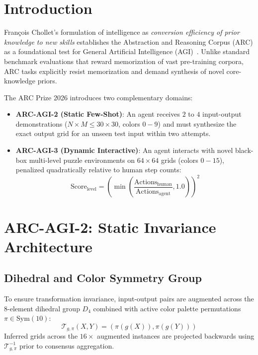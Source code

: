 \documentclass[10pt,journal,compsoc]{IEEEtran}
\begin{document}
\section{Introduction}
François Chollet's formulation of intelligence as \emph{conversion efficiency of prior knowledge to new skills} establishes the Abstraction and Reasoning Corpus (ARC) as a foundational test for General Artificial Intelligence (AGI)~\cite{chollet2019measure}. Unlike standard benchmark evaluations that reward memorization of vast pre-training corpora, ARC tasks explicitly resist memorization and demand synthesis of novel core-knowledge priors.

The ARC Prize 2026 introduces two complementary domains:
\begin{itemize}
    \item \textbf{ARC-AGI-2 (Static Few-Shot)}: An agent receives $2$ to $4$ input-output demonstrations ($N \times M \le 30 \times 30$, colors $0-9$) and must synthesize the exact output grid for an unseen test input within two attempts.
    \item \textbf{ARC-AGI-3 (Dynamic Interactive)}: An agent interacts with novel black-box multi-level puzzle environments on $64 \times 64$ grids (colors $0-15$), penalized quadratically relative to human step counts:
    \begin{equation}
        \text{Score}_{\text{level}} = \left( \min\left( \frac{\text{Actions}_{\text{human}}}{\text{Actions}_{\text{agent}}}, 1.0 \right) \right)^2
    \end{equation}
\end{itemize}

\section{ARC-AGI-2: Static Invariance Architecture}
\subsection{Dihedral and Color Symmetry Group}
To ensure transformation invariance, input-output pairs are augmented across the 8-element dihedral group $D_4$ combined with active color palette permutations $\pi \in \text{Sym}(10)$:
\begin{equation}
    \mathcal{T}_{g, \pi}(X, Y) = \left( \pi(g(X)), \pi(g(Y)) \right)
\end{equation}
Inferred grids across the $16\times$ augmented instances are projected backwards using $\mathcal{T}_{g, \pi}^{-1}$ prior to consensus aggregation.
\end{document}
